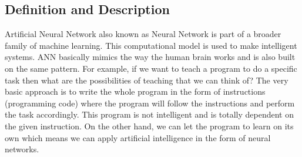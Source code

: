 \subsection{Definition and Description}
 \cite{ann_def}
\newline
\newline
\par
Artificial Neural Network also known as Neural Network is part of a broader family of machine learning. This computational model is used to make intelligent systems. ANN basically mimics the way the human brain works and is also built on the same pattern. For example, if we want to teach a program to do a specific task then what are the possibilities of teaching that we can think of? The very basic approach is to write the whole program in the form of instructions (programming code) where the program will follow the instructions and perform the task accordingly. This program is not intelligent and is totally dependent on the given instruction. On the other hand, we can let the program to learn on its own which means we can apply artificial intelligence in the form of neural networks. 
\par
